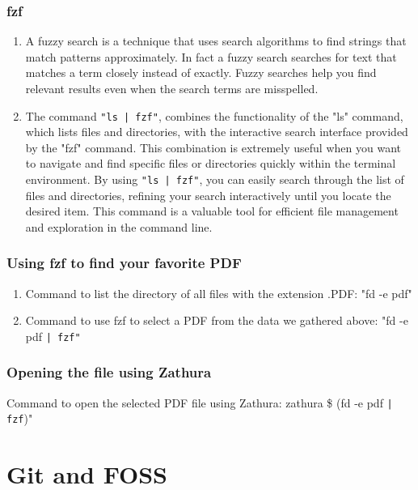 \documentclass[titlepage]{article}
\begin{document}
\subsubsection{fzf}
\begin{enumerate}
\item A fuzzy search is a technique that uses search algorithms to find strings that match patterns approximately. In fact a fuzzy search searches for text that matches a term closely instead of exactly. Fuzzy searches help you find relevant results even when the search terms are misspelled.
\item The command \texttt{"ls | fzf"}, combines the functionality of the "ls" command, which lists files and directories, with the interactive search interface provided by the "fzf" command. This combination is extremely useful when you want to navigate and find specific files or directories quickly within the terminal environment. By using \texttt{"ls | fzf"}, you can easily search through the list of files and directories, refining your search interactively until you locate the desired item. This command is a valuable tool for efficient file management and exploration in the command line.
\end{enumerate}
\newpage
{}
\fancyhead[R]{}
\subsubsection{Using fzf to find your favorite PDF}
\begin{enumerate}
\item Command to list the directory of all files with the extension .PDF: "fd -e pdf"
\item Command to use fzf to select a PDF from the data we gathered above: "fd -e pdf \texttt{| fzf"}
\end{enumerate}
\subsubsection{ Opening the file using Zathura}
Command to open the selected PDF file using Zathura: zathura  \$ (fd -e pdf \texttt{| fzf})" 
\section {Git and FOSS}
\end{document}
